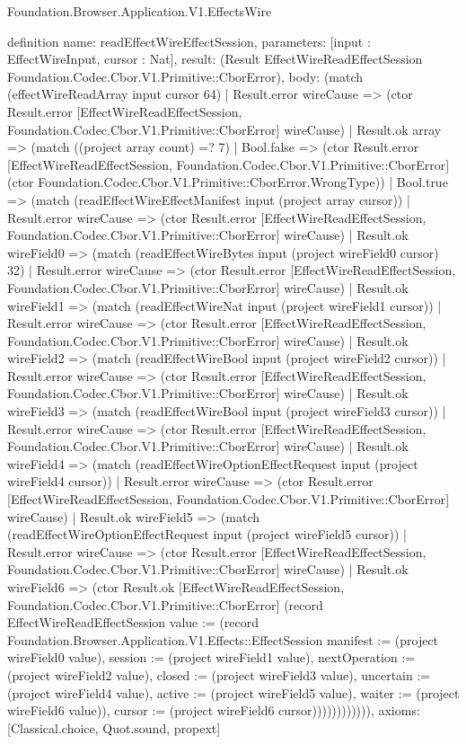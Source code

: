 \begin{lexlean}{Foundation.Browser.Application.V1.EffectsWire}
\begin{semanticmodule}
definition{
  name: readEffectWireEffectSession,
  parameters: [input : EffectWireInput, cursor : Nat],
  result: (Result EffectWireReadEffectSession Foundation.Codec.Cbor.V1.Primitive::CborError),
  body: (match (effectWireReadArray input cursor 64)
    | Result.error wireCause => (ctor Result.error [EffectWireReadEffectSession, Foundation.Codec.Cbor.V1.Primitive::CborError] wireCause)
    | Result.ok array => (match ((project array count) =? 7)
      | Bool.false => (ctor Result.error [EffectWireReadEffectSession, Foundation.Codec.Cbor.V1.Primitive::CborError] (ctor Foundation.Codec.Cbor.V1.Primitive::CborError.WrongType))
      | Bool.true => (match (readEffectWireEffectManifest input (project array cursor))
        | Result.error wireCause => (ctor Result.error [EffectWireReadEffectSession, Foundation.Codec.Cbor.V1.Primitive::CborError] wireCause)
        | Result.ok wireField0 => (match (readEffectWireBytes input (project wireField0 cursor) 32)
          | Result.error wireCause => (ctor Result.error [EffectWireReadEffectSession, Foundation.Codec.Cbor.V1.Primitive::CborError] wireCause)
          | Result.ok wireField1 => (match (readEffectWireNat input (project wireField1 cursor))
            | Result.error wireCause => (ctor Result.error [EffectWireReadEffectSession, Foundation.Codec.Cbor.V1.Primitive::CborError] wireCause)
            | Result.ok wireField2 => (match (readEffectWireBool input (project wireField2 cursor))
              | Result.error wireCause => (ctor Result.error [EffectWireReadEffectSession, Foundation.Codec.Cbor.V1.Primitive::CborError] wireCause)
              | Result.ok wireField3 => (match (readEffectWireBool input (project wireField3 cursor))
                | Result.error wireCause => (ctor Result.error [EffectWireReadEffectSession, Foundation.Codec.Cbor.V1.Primitive::CborError] wireCause)
                | Result.ok wireField4 => (match (readEffectWireOptionEffectRequest input (project wireField4 cursor))
                  | Result.error wireCause => (ctor Result.error [EffectWireReadEffectSession, Foundation.Codec.Cbor.V1.Primitive::CborError] wireCause)
                  | Result.ok wireField5 => (match (readEffectWireOptionEffectRequest input (project wireField5 cursor))
                    | Result.error wireCause => (ctor Result.error [EffectWireReadEffectSession, Foundation.Codec.Cbor.V1.Primitive::CborError] wireCause)
                    | Result.ok wireField6 => (ctor Result.ok [EffectWireReadEffectSession, Foundation.Codec.Cbor.V1.Primitive::CborError] (record EffectWireReadEffectSession {value := (record Foundation.Browser.Application.V1.Effects::EffectSession {manifest := (project wireField0 value), session := (project wireField1 value), nextOperation := (project wireField2 value), closed := (project wireField3 value), uncertain := (project wireField4 value), active := (project wireField5 value), waiter := (project wireField6 value)}), cursor := (project wireField6 cursor)}))))))))))),
  axioms: [Classical.choice, Quot.sound, propext]
}


\end{semanticmodule}
\end{lexlean}
